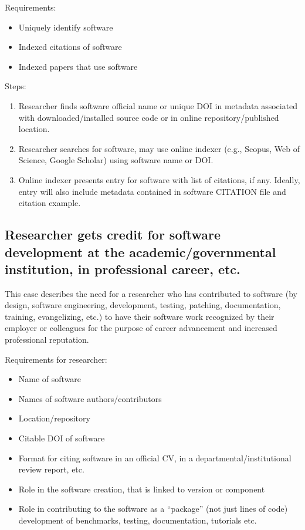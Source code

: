\documentclass[12pt, oneside]{amsart}
\begin{document}
Requirements:
\begin{itemize}
\item Uniquely identify software
\item Indexed citations of software
\item Indexed papers that use software
\end{itemize}

Steps:
\begin{enumerate}
\item Researcher finds software official name or unique DOI in metadata associated with downloaded/installed source code or in online repository/published location.
\item Researcher searches for software, may use online indexer (e.g., Scopus, Web of Science, Google Scholar) using software name or DOI.
\item Online indexer presents entry for software with list of citations, if any.
Ideally, entry will also include metadata contained in software CITATION file and citation example.
\end{enumerate}

\subsection{Researcher gets credit for software development at the academic\slash governmental institution, in professional career, etc.}

This case describes the need for a researcher who has contributed to software (by design, software engineering, development, testing, patching, documentation, training, evangelizing, etc.)
to have their software work recognized by their employer or colleagues for the purpose of career advancement and increased professional reputation.

Requirements for researcher:
\begin{itemize}
\item Name of software
\item Names of software authors/contributors
\item Location/repository
\item Citable DOI of software
\item Format for citing software in an official CV, in a departmental/institutional review report, etc.
\item Role in the software creation, that is linked to version or component
\item Role in contributing to the software as a ``package'' (not just lines of code) development of benchmarks, testing, documentation, tutorials etc.
\end{itemize}
\end{document}
